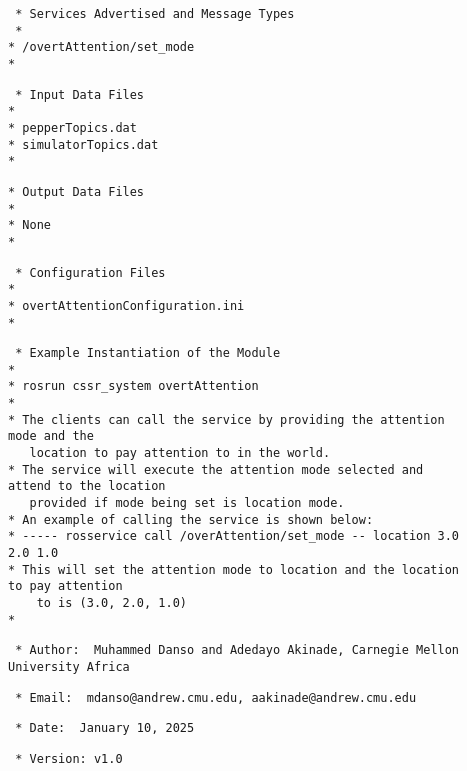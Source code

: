 \documentclass{CSSRforAfrica}
\newcommand{\checkboxChecked}{\fbox{\ding{51}}} %
\begin{document}
\begin{description}
\item[\checkboxChecked] 
 {\small 
\begin{verbatim}                    
 * Services Advertised and Message Types
 * 
* /overtAttention/set_mode  
* 
\end{verbatim}}

\item[\checkboxChecked] 
 {\small 
\begin{verbatim}
 * Input Data Files
*
* pepperTopics.dat
* simulatorTopics.dat
*
\end{verbatim}}

\item[\checkboxChecked] 
 {\small 
\begin{verbatim}
* Output Data Files
*
* None
*
\end{verbatim}}

\item[\checkboxChecked] 
 {\small 
\begin{verbatim}
 * Configuration Files
*
* overtAttentionConfiguration.ini
*
\end{verbatim}}

\item[\checkboxChecked] 
 {\small 
\begin{verbatim}
 * Example Instantiation of the Module
*
* rosrun cssr_system overtAttention
*
* The clients can call the service by providing the attention mode and the 
   location to pay attention to in the world.
* The service will execute the attention mode selected and attend to the location 
   provided if mode being set is location mode.
* An example of calling the service is shown below:
* ----- rosservice call /overAttention/set_mode -- location 3.0 2.0 1.0
* This will set the attention mode to location and the location to pay attention 
    to is (3.0, 2.0, 1.0)
*
\end{verbatim}}

\item[\checkboxChecked] 
 {\small 
\begin{verbatim}
 * Author:  Muhammed Danso and Adedayo Akinade, Carnegie Mellon University Africa
\end{verbatim}}

\item[\checkboxChecked] 
 {\small 
\begin{verbatim}
 * Email:  mdanso@andrew.cmu.edu, aakinade@andrew.cmu.edu
\end{verbatim}}

\item[\checkboxChecked] 
 {\small 
\begin{verbatim}
 * Date:  January 10, 2025
\end{verbatim}}

\item[\checkboxChecked] 
 {\small 
\begin{verbatim}
 * Version: v1.0
\end{verbatim}}


\end{description}
\end{document}
